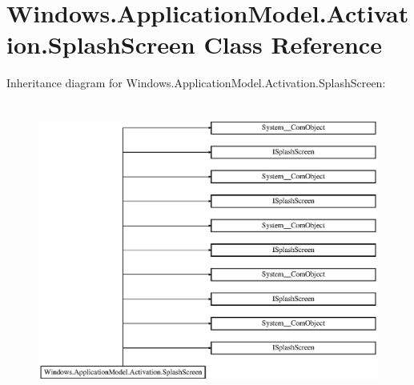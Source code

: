 \hypertarget{class_windows_1_1_application_model_1_1_activation_1_1_splash_screen}{}\section{Windows.\+Application\+Model.\+Activation.\+Splash\+Screen Class Reference}
\label{class_windows_1_1_application_model_1_1_activation_1_1_splash_screen}
Inheritance diagram for Windows.\+Application\+Model.\+Activation.\+Splash\+Screen\+:\begin{figure}[H]
\begin{center}
\leavevmode
\includegraphics[height=9.777778cm]{class_windows_1_1_application_model_1_1_activation_1_1_splash_screen}
\end{center}
\end{figure}
